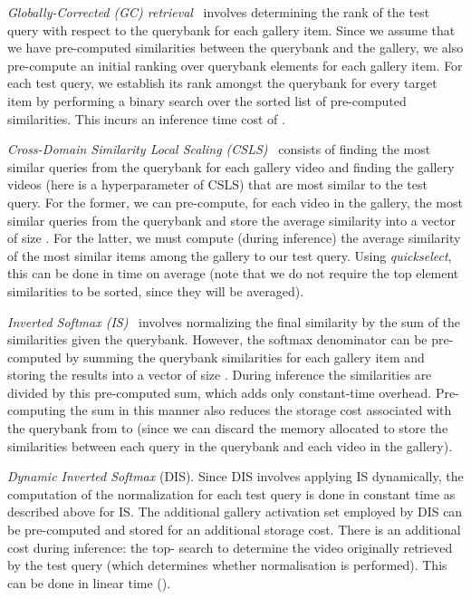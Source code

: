 \indent \textit{Globally-Corrected (GC) retrieval}~\cite{dinu2014improving}
involves determining the rank of the test query with respect
to the querybank for each gallery item.
Since we assume that we have pre-computed similarities between
the querybank and the gallery, we also pre-compute an initial
ranking over querybank elements for each gallery item.
For each test query, we establish its rank amongst the querybank
for every target item by performing a binary search over the
sorted list of pre-computed similarities.
This incurs an inference time cost of .

\indent \textit{Cross-Domain Similarity Local
Scaling (CSLS)}~\cite{conneau2018word}
consists of finding the most similar queries
from the querybank for each gallery video
and finding the  gallery videos
(here  is a hyperparameter of CSLS)
that are most similar to the test query.
For the former, we can pre-compute, for each video in the gallery,
the  most similar queries from the querybank and store the
average similarity into a vector of size .
For the latter,
we must compute (during inference)
the average similarity of the  most similar
items among the gallery to our test query.
Using \textit{quickselect}, this can be done in  time on
average (note that we do not require the top  element similarities
to be sorted, since they will be averaged).


\indent \textit{Inverted Softmax (IS)}~\cite{smith2017offline}
involves normalizing the final similarity by the sum of the
similarities given the querybank.
However, the softmax denominator can be pre-computed by summing
the querybank similarities for each gallery item and storing the results
into a vector of size .
During inference the similarities are divided by this pre-computed sum,
which adds only constant-time overhead.
Pre-computing the sum in this manner
also reduces the storage cost associated with the querybank
from  to 
(since we can discard the memory allocated to store the similarities
between each query in the querybank and each video in the gallery).

\indent \textit{Dynamic Inverted Softmax} (DIS).
Since DIS involves applying IS dynamically,
the computation of the normalization for each test query
is done in constant time as described above for IS.
The additional gallery activation set employed by DIS
can be pre-computed and stored for an additional
 storage cost.
There is an additional cost during inference:
the top- search to determine the video originally retrieved
by the test query (which determines whether normalisation is performed).
This can be done in linear time ().

